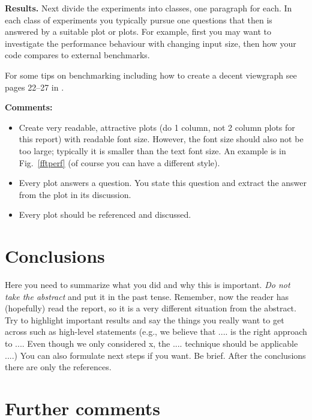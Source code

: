 \documentclass[letterpaper]{article}
\newcommand{\mypar}[1]{{\bf #1.}}
\begin{document}
\mypar{Results}
Next divide the experiments into classes, one paragraph for each. In each class of experiments you typically pursue one questions that then is answered by a suitable plot or plots. For example, first you may want to investigate the performance behaviour with changing input size, then how your code compares to external benchmarks.

For some tips on benchmarking including how to create a decent viewgraph see pages 22--27 in \cite{Pueschel:10}.

{\bf Comments:}
\begin{itemize}
\item Create very readable, attractive plots (do 1 column, not 2 column plots
for this report) with readable font size. However, the font size should also not be too large; typically it is smaller than the text font size.
An example is in Fig.~\ref{fftperf} (of course you can have a different style).
\item Every plot answers a question. You state this question and extract the
answer from the plot in its discussion.
\item Every plot should be referenced and discussed.
\end{itemize}


\section{Conclusions}

Here you need to summarize what you did and why this is
important. {\em Do not take the abstract} and put it in the past
tense. Remember, now the reader has (hopefully) read the report, so it
is a very different situation from the abstract. Try to highlight
important results and say the things you really want to get across
such as high-level statements (e.g., we believe that .... is the right
approach to .... Even though we only considered x, the
.... technique should be applicable ....) You can also formulate next
steps if you want. Be brief. After the conclusions there are only the references.

\section{Further comments}
\end{document}
